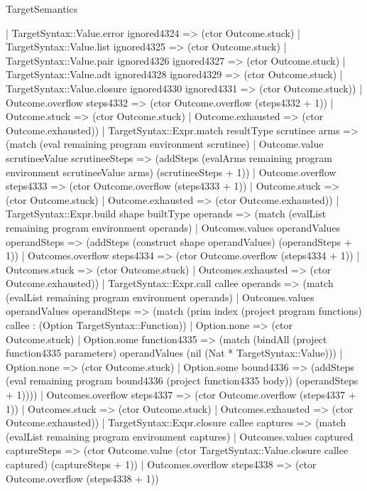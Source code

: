 \begin{lexlean}{TargetSemantics}
\begin{semanticmodule}
{          | TargetSyntax::Value.error ignored4324 => (ctor Outcome.stuck)
          | TargetSyntax::Value.list ignored4325 => (ctor Outcome.stuck)
          | TargetSyntax::Value.pair ignored4326 ignored4327 => (ctor Outcome.stuck)
          | TargetSyntax::Value.adt ignored4328 ignored4329 => (ctor Outcome.stuck)
          | TargetSyntax::Value.closure ignored4330 ignored4331 => (ctor Outcome.stuck))
        | Outcome.overflow steps4332 => (ctor Outcome.overflow (steps4332 + 1))
        | Outcome.stuck => (ctor Outcome.stuck)
        | Outcome.exhausted => (ctor Outcome.exhausted))
      | TargetSyntax::Expr.match resultType scrutinee arms => (match (eval remaining program environment scrutinee)
        | Outcome.value scrutineeValue scrutineeSteps => (addSteps (evalArms remaining program environment scrutineeValue arms) (scrutineeSteps + 1))
        | Outcome.overflow steps4333 => (ctor Outcome.overflow (steps4333 + 1))
        | Outcome.stuck => (ctor Outcome.stuck)
        | Outcome.exhausted => (ctor Outcome.exhausted))
      | TargetSyntax::Expr.build shape builtType operands => (match (evalList remaining program environment operands)
        | Outcomes.values operandValues operandSteps => (addSteps (construct shape operandValues) (operandSteps + 1))
        | Outcomes.overflow steps4334 => (ctor Outcome.overflow (steps4334 + 1))
        | Outcomes.stuck => (ctor Outcome.stuck)
        | Outcomes.exhausted => (ctor Outcome.exhausted))
      | TargetSyntax::Expr.call callee operands => (match (evalList remaining program environment operands)
        | Outcomes.values operandValues operandSteps => (match (prim index (project program functions) callee : (Option TargetSyntax::Function))
          | Option.none => (ctor Outcome.stuck)
          | Option.some function4335 => (match (bindAll (project function4335 parameters) operandValues (nil (Nat * TargetSyntax::Value)))
            | Option.none => (ctor Outcome.stuck)
            | Option.some bound4336 => (addSteps (eval remaining program bound4336 (project function4335 body)) (operandSteps + 1))))
        | Outcomes.overflow steps4337 => (ctor Outcome.overflow (steps4337 + 1))
        | Outcomes.stuck => (ctor Outcome.stuck)
        | Outcomes.exhausted => (ctor Outcome.exhausted))
      | TargetSyntax::Expr.closure callee captures => (match (evalList remaining program environment captures)
        | Outcomes.values captured captureSteps => (ctor Outcome.value (ctor TargetSyntax::Value.closure callee captured) (captureSteps + 1))
        | Outcomes.overflow steps4338 => (ctor Outcome.overflow (steps4338 + 1))
}
\end{semanticmodule}
\end{lexlean}
